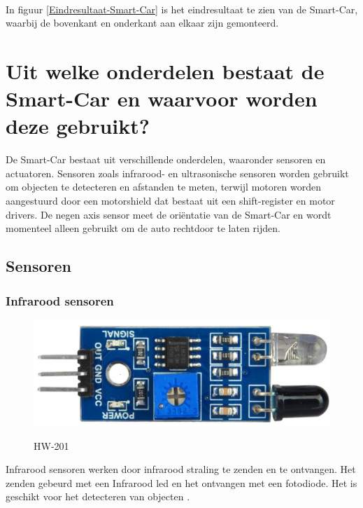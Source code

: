 \\
In figuur \ref{Eindresultaat-Smart-Car} is het eindresultaat te zien van de \gls{Smart-Car}, waarbij de bovenkant en onderkant aan elkaar zijn gemonteerd.


\section{Uit welke onderdelen bestaat de Smart-Car en waarvoor worden deze gebruikt?}
De \gls{Smart-Car} bestaat uit verschillende onderdelen, waaronder sensoren en actuatoren. Sensoren zoals infrarood\cite{IR-datasheet}- en ultrasonische sensoren worden gebruikt om objecten te detecteren en afstanden te meten, terwijl motoren worden aangestuurd door een \gls{motorshield} dat bestaat uit een \gls{shift-register} en motor drivers\cite{h-brug}. De negen axis sensor meet de oriëntatie van de \gls{Smart-Car} en wordt momenteel alleen gebruikt om de auto rechtdoor te laten rijden.
\subsection{Sensoren}
\subsubsection{Infrarood sensoren} \label{Hoofdstuk-IR-onderdelen}
\begin{figure}[h]
    \centering
    \includegraphics[scale = 0.35]{Media/Figuren/HW-201.jpg}
    \caption{HW-201}
    \label{HW-201}
    \cite{HW-201-hardware} 
\end{figure}
Infrarood sensoren werken door infrarood straling te zenden en te ontvangen. Het zenden gebeurd met een Infrarood led en het ontvangen met een fotodiode. Het is geschikt voor het detecteren van objecten \cite{IR-datasheet}.

